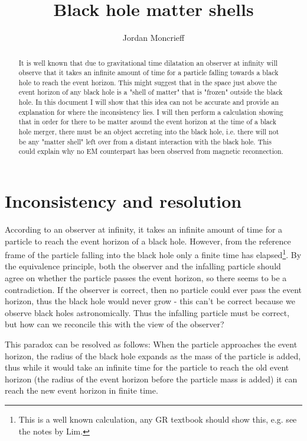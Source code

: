 \documentclass{article}
\title{Black hole matter shells}
\author{Jordan Moncrieff}
\begin{document}
\maketitle

\begin{abstract}
It is well known that due to gravitational time dilatation an observer at infinity will observe that it takes an infinite amount of time for a particle falling towards a black hole to reach the event horizon. This might suggest that in the space just above the event horizon of any black hole is a "shell of matter" that is "frozen" outside the black hole. In this document I will show that this idea can not be accurate and provide an explanation for where the inconsistency lies. I will then perform a calculation showing that in order for there to be matter around the event horizon at the time of a black hole merger, there must be an object accreting into the black hole, i.e. there will not be any "matter shell" left over from a distant interaction with the black hole. This could explain why no EM counterpart has been observed from magnetic reconnection.
\end{abstract}

\section{Inconsistency and resolution}

According to an observer at infinity, it takes an infinite amount of time for a particle to reach the event horizon of a black hole. However, from the reference frame of the particle falling into the black hole only a finite time has elapsed\footnote{This is a well known calculation, any GR textbook should show this, e.g. see the notes by Lim.}. By the equivalence principle, both the observer and the infalling particle should agree on whether the particle passes the event horizon, so there seems to be a contradiction. If the observer is correct, then no particle could ever pass the event horizon, thus the black hole would never grow - this can't be correct because we observe black holes astronomically. Thus the infalling particle must be correct, but how can we reconcile this with the view of the observer?

This paradox can be resolved as follows: When the particle approaches the event horizon, the radius of the black hole expands as the mass of the particle is added, thus while it would take an infinite time for the particle to reach the old event horizon (the radius of the event horizon before the particle mass is added) it can reach the new event horizon in finite time. 
\end{document}
